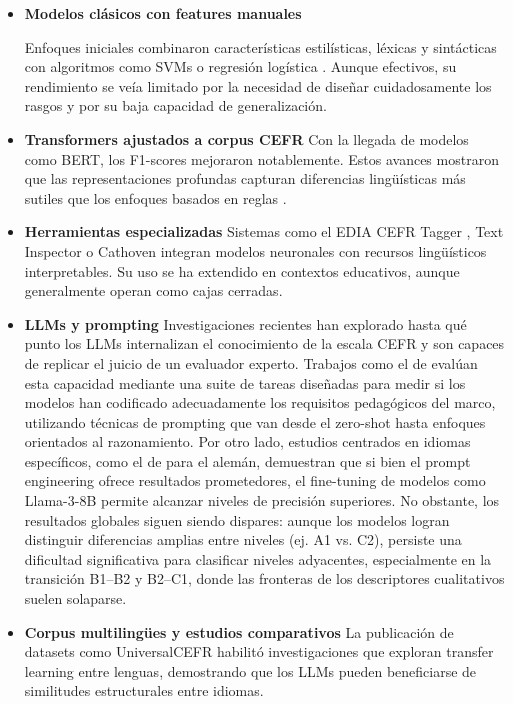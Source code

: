 \begin{itemize}
    \item \textbf{Modelos clásicos con features manuales}
    
    Enfoques iniciales combinaron características estilísticas, léxicas y sintácticas con algoritmos como SVMs o regresión logística \cite{Xia2019}. Aunque efectivos, su rendimiento se veía limitado por la necesidad de diseñar cuidadosamente los rasgos y por su baja capacidad de generalización.

    \item \textbf{Transformers ajustados a corpus CEFR}
    Con la llegada de modelos como BERT, los F1-scores mejoraron notablemente. Estos avances mostraron que las representaciones profundas capturan diferencias lingüísticas más sutiles que los enfoques basados en reglas \cite{JulianaSchmalz2021}.

    \item \textbf{Herramientas especializadas}
    Sistemas como el EDIA CEFR Tagger \cite{edia}, Text Inspector \cite{text_inspector} o Cathoven \cite{cathoven} integran modelos neuronales con recursos lingüísticos interpretables. Su uso se ha extendido en contextos educativos, aunque generalmente operan como cajas cerradas.

    \item \textbf{LLMs y prompting}
    Investigaciones recientes han explorado hasta qué punto los LLMs internalizan el conocimiento de la escala CEFR y son capaces de replicar el juicio de un evaluador experto. Trabajos como el de \cite{Benedetto2025} evalúan esta capacidad mediante una suite de tareas diseñadas para medir si los modelos han codificado adecuadamente los requisitos pedagógicos del marco, utilizando técnicas de prompting que van desde el zero-shot hasta enfoques orientados al razonamiento. Por otro lado, estudios centrados en idiomas específicos, como el de \cite{aleman} para el alemán, demuestran que si bien el prompt engineering ofrece resultados prometedores, el fine-tuning de modelos como Llama-3-8B permite alcanzar niveles de precisión superiores. No obstante, los resultados globales siguen siendo dispares: aunque los modelos logran distinguir diferencias amplias entre niveles (ej. A1 vs. C2), persiste una dificultad significativa para clasificar niveles adyacentes, especialmente en la transición B1–B2 y B2–C1, donde las fronteras de los descriptores cualitativos suelen solaparse.

    \item \textbf{Corpus multilingües y estudios comparativos}
    La publicación de datasets como UniversalCEFR \cite{Imperial2025} habilitó investigaciones que exploran transfer learning entre lenguas, demostrando que los LLMs pueden beneficiarse de similitudes estructurales entre idiomas.
\end{itemize}

